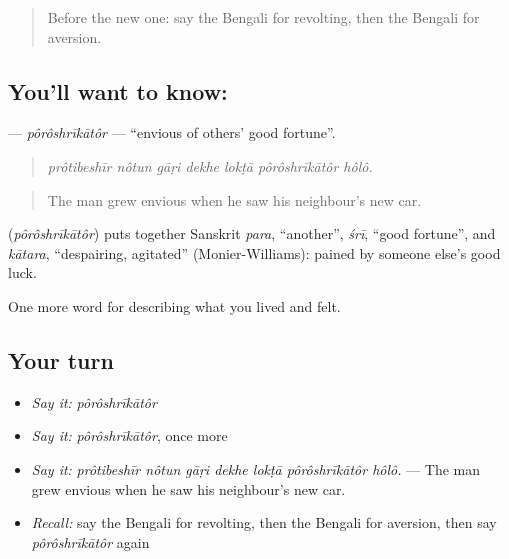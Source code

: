 \label{lesson:BN-C451-poroshrikator}



\begin{quote}
Before the new one: say the Bengali for revolting, then the Bengali for aversion.
\end{quote}

\subsection*{You'll want to know: }
\textbf{} — \emph{pôrôshrīkātôr} — \textquotedblleft{}envious of others' good fortune\textquotedblright{}.

\begin{quote}
      
\end{quote}

\begin{quote}
\emph{prôtibeshīr nôtun gāṛi dekhe lokṭā pôrôshrīkātôr hôlô.}
\end{quote}

\begin{quote}
The man grew envious when he saw his neighbour's new car.
\end{quote}

\begin{cousinweb}
\textbf{} (\emph{pôrôshrīkātôr}) puts together Sanskrit \emph{para}, \textquotedblleft{}another\textquotedblright{}, \emph{śrī}, \textquotedblleft{}good fortune\textquotedblright{}, and \emph{kātara}, \textquotedblleft{}despairing, agitated\textquotedblright{} (Monier-Williams): pained by someone else's good luck.
\end{cousinweb}

\begin{grammarlens}[title={What you've built}]
One more word for describing what you lived and felt.
\end{grammarlens}

\subsection*{Your turn}
\begin{itemize}
\raggedright
  \item \emph{Say it:} \emph{pôrôshrīkātôr}
  \item \emph{Say it:} \emph{pôrôshrīkātôr}, once more
  \item \emph{Say it:} \emph{prôtibeshīr nôtun gāṛi dekhe lokṭā pôrôshrīkātôr hôlô.} — The man grew envious when he saw his neighbour's new car.
  \item \emph{Recall:} say the Bengali for revolting, then the Bengali for aversion, then say \emph{pôrôshrīkātôr} again
\end{itemize}

